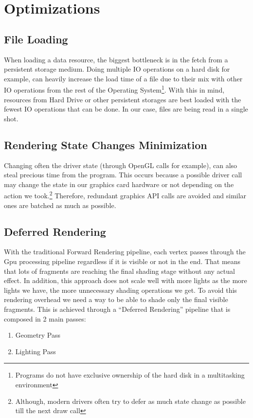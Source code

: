 \section{Optimizations}

\subsection{File Loading}
When loading a data resource, the biggest bottleneck is in the fetch from a persistent storage medium.
Doing multiple IO operations on a hard disk for example, can heavily increase the load time of a file
due to their mix with other IO operations from the rest of the Operating System\footnote{Programs do
not have exclusive ownership of the hard disk in a multitasking environment}. With this in mind, resources
from Hard Drive or other persistent storages are best loaded with the fewest IO operations that can be done.
In our case, files are being read in a single shot.

\subsection{Rendering State Changes Minimization}
Changing often the driver state (through OpenGL calls for example), can also steal precious time from the program.
This occurs because a possible driver call may change the state in our graphics card hardware or not depending
on the action we took.\footnote{Although, modern drivers often try to defer as much state change as possible
till the next draw call} Therefore, redundant graphics API calls are avoided and similar ones are batched
as much as possible.

\subsection{Deferred Rendering}
With the traditional Forward Rendering pipeline, each vertex passes through the Gpu processing pipeline
regardless if it is visible or not in the end. That means that lots of fragments are reaching the final
shading stage without any actual effect. In addition, this approach does not scale well with more lights
as the more lights we have, the more unnecessary shading operations we get. To avoid this rendering overhead
we need a way to be able to shade only the final visible fragments. This is achieved through a ``Deferred
Rendering'' pipeline that is composed in 2 main passes:

\begin{enumerate}
\item Geometry Pass
\item Lighting Pass
\end{enumerate}

